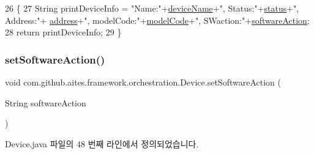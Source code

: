 \begin{DoxyCode}
26                                \{
27         String printDeviceInfo = \textcolor{stringliteral}{"Name:"}+\mbox{\hyperlink{classcom_1_1github_1_1aites_1_1framework_1_1orchestration_1_1_device_aa4746e20c5c8b51170b4ada37295f69e}{deviceName}}+\textcolor{stringliteral}{", Status:"}+\mbox{\hyperlink{classcom_1_1github_1_1aites_1_1framework_1_1orchestration_1_1_device_abe5c31f96d08c3caf2085af43d59cf6f}{status}}+\textcolor{stringliteral}{", Address:"}+
      \mbox{\hyperlink{classcom_1_1github_1_1aites_1_1framework_1_1orchestration_1_1_device_a81329ac5d638ae2e569595efd92a4fe4}{address}}+\textcolor{stringliteral}{", modelCode:"}+\mbox{\hyperlink{classcom_1_1github_1_1aites_1_1framework_1_1orchestration_1_1_device_ad40a301c336d5b74572d497eff8c90eb}{modelCode}}+\textcolor{stringliteral}{", SWaction:"}+\mbox{\hyperlink{classcom_1_1github_1_1aites_1_1framework_1_1orchestration_1_1_device_a0e90e3fc258c236228d8789722bdf3bb}{softwareAction}};
28         \textcolor{keywordflow}{return} printDeviceInfo;
29     \}
\end{DoxyCode}
\mbox{\label{classcom_1_1github_1_1aites_1_1framework_1_1orchestration_1_1_device_a8df054b4a7773e208d0350127bdf8f8c}} 
\subsubsection{\texorpdfstring{set\+Software\+Action()}{setSoftwareAction()}}
{\footnotesize\ttfamily void com.\+github.\+aites.\+framework.\+orchestration.\+Device.\+set\+Software\+Action (\begin{DoxyParamCaption}\item[{String}]{software\+Action }\end{DoxyParamCaption})}



Device.\+java 파일의 48 번째 라인에서 정의되었습니다.


